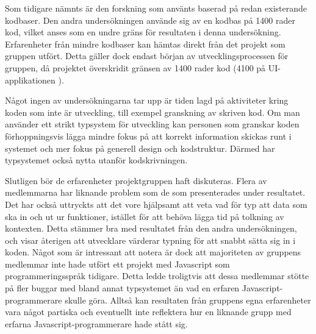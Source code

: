 Som tidigare nämnts är den forskning som använts baserad på redan existerande kodbaser. Den andra undersökningen använde sig av en kodbas på 1400 rader kod, vilket anses som en undre gräns för resultaten i denna undersökning. Erfarenheter från mindre kodbaser kan hämtas direkt från det projekt som gruppen utfört. Detta gäller dock endast början av utvecklingsprocessen för gruppen, då projektet överskridit gränsen av 1400 rader kod (4100 på UI-applikationen \cite{current-ui-commit}).

Något ingen av undersökningarna tar upp är tiden lagd på aktiviteter kring koden som inte är utveckling, till exempel granskning av skriven kod. Om man använder ett strikt typsystem för utveckling kan personen som granskar koden förhoppningsvis lägga mindre fokus på att korrekt information skickas runt i systemet och mer fokus på generell design och kodstruktur. Därmed har typsystemet också nytta utanför kodskrivningen.

Slutligen bör de erfarenheter projektgruppen haft diskuteras. Flera av medlemmarna har liknande problem som de som presenterades under resultatet. Det har också uttryckts att det vore hjälpsamt att veta vad för typ att data som ska in och ut ur funktioner, istället för att behöva lägga tid på tolkning av kontexten. Detta stämmer bra med resultatet från den andra undersökningen, och visar återigen att utvecklare värderar typning för att snabbt sätta sig in i koden. Något som är intressant att notera är dock att majoriteten av gruppens medlemmar inte hade utfört ett projekt med Javascript som programmeringsspråk tidigare. Detta ledde troligtvis att dessa medlemmar stötte på fler buggar med bland annat typsystemet än vad en erfaren Javascript-programmerare skulle göra. Alltså kan resultaten från gruppens egna erfarenheter vara något partiska och eventuellt inte reflektera hur en liknande grupp med erfarna Javascript-programmerare hade stått sig. 

\pagebreak